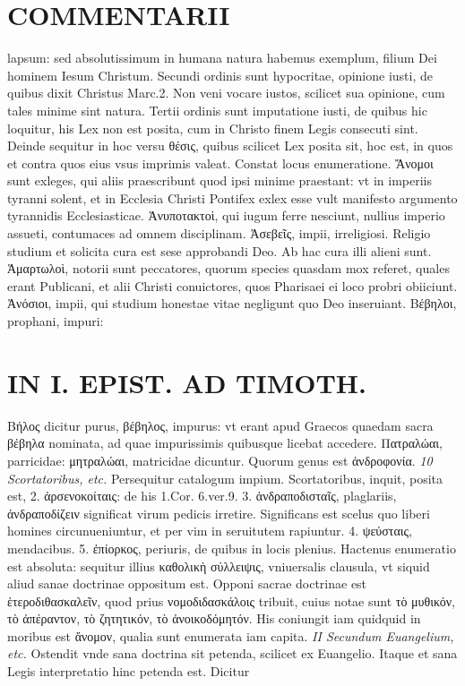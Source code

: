 \documentclass{article}
\begin{document}
\begin{pages}
\section*{COMMENTARII }
\marginpar{[ p.28 ]}\pstart lapsum: sed absolutissimum in humana natura habemus exemplum, filium Dei hominem Iesum Christum. Secundi ordinis sunt hypocritae, opinione iusti, de quibus dixit Christus Marc.2. Non veni vocare iustos, scilicet sua opinione, cum tales minime sint natura. Tertii ordinis sunt imputatione iusti, de quibus hic loquitur, his Lex non est posita, cum in Christo finem Legis consecuti sint.  \pend\pstart Deinde sequitur in hoc versu θέσις, quibus scilicet Lex posita sit, hoc est, in quos et contra quos eius vsus imprimis valeat. Constat locus enumeratione. Ἄνομοι sunt exleges, qui aliis praescribunt quod ipsi minime praestant: vt in imperiis tyranni solent, et in Ecclesia Christi Pontifex exlex esse vult manifesto argumento tyrannidis Ecclesiasticae.  \pend\pstart Ἀνυποτακτοὶ, qui iugum ferre nesciunt, nullius imperio assueti, contumaces ad omnem disciplinam.  \pend\pstart Ἀσεβεῖς, impii, irreligiosi. Religio studium et solicita cura est sese approbandi Deo. Ab hac cura illi alieni sunt.  \pend\pstart Ἁμαρτωλοὶ, notorii sunt peccatores, quorum species quasdam mox referet, quales erant Publicani, et alii Christi conuictores, quos Pharisaei ei loco probri obiiciunt. Ἀνόσιοι, impii, qui studium honestae vitae negligunt quo Deo inseruiant. Βέβηλοι, prophani, impuri:  \pend
\section*{IN I. EPIST. AD TIMOTH. }
\marginpar{[ p.29 ]}\pstart Βήλος dicitur purus, βέβηλος, impurus: vt erant apud Graecos quaedam sacra βέβηλα nominata, ad quae impurissimis quibusque licebat accedere. Πατραλώαι, parricidae: μητραλώαι, matricidae dicuntur. Quorum genus est ἀνδροφονία.  \pend
\textit{10 Scortatoribus, etc. }\pstart Persequitur catalogum impium. Scortatoribus, inquit, posita est, 2. ἀρσενοκοίταις: de his 1.Cor. 6.ver.9. 3. ἀνδραποδισταῖς, plaglariis, ἀνδραποδίζειν significat virum pedicis irretire. Significans est scelus quo liberi homines circunueniuntur, et per vim in seruitutem rapiuntur. 4. ψεύσταις, mendacibus. 5. ἐπίορκος, periuris, de quibus in locis plenius. Hactenus enumeratio est absoluta: sequitur illius καθολικὴ σύλλειψις, vniuersalis clausula, vt siquid aliud sanae doctrinae oppositum est. Opponi sacrae doctrinae est ἑτεροδιθασκαλεῖν, quod prius νομοδιδασκάλοις tribuit, cuius notae sunt τὸ μυθικόν, τὸ ἀπέραντον, τὸ  ζητητικόν, τὸ ἀνοικοδόμητόν. His coniungit iam quidquid in moribus est ἄνομον, qualia sunt enumerata iam capita.  \pend
\textit{II Secundum Euangelium, etc. }\pstart Ostendit vnde sana doctrina sit petenda, scilicet ex Euangelio. Itaque et sana Legis interpretatio hinc petenda est. Dicitur  \pend

\end{pages}
\end{document}
